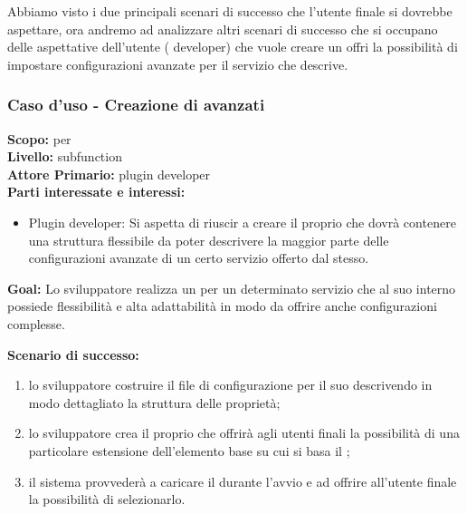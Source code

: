 \begin{flushleft}
\begin{boxedminipage}{\textwidth}
\end{boxedminipage}
\end{flushleft}
Abbiamo visto i due principali scenari di successo che l'utente finale si dovrebbe aspettare, ora andremo ad analizzare altri scenari di successo che si occupano delle aspettative dell'utente (\plugin{} developer) che vuole creare un \plugin{} offri la possibilità di impostare configurazioni avanzate per il servizio che descrive.

\begin{flushleft}
\begin{boxedminipage}{\textwidth}

\subsubsection*{Caso d'uso - Creazione di \plugin{} avanzati}

\textbf{Scopo:} \plugin{} per \visualnetkit{} \\
\textbf{Livello:} subfunction \\
\textbf{Attore Primario:} plugin developer \\
\textbf{Parti interessate e interessi:}
\begin{itemize}
\item Plugin developer: Si aspetta di riuscir a creare il proprio \plugin{} che dovrà contenere una struttura flessibile da poter descrivere la maggior parte delle configurazioni avanzate di un certo servizio offerto dal \plugin{} stesso.
\end{itemize}

\textbf{Goal:} Lo sviluppatore realizza un \plugin{} per un determinato servizio che al suo interno possiede flessibilità e alta adattabilità in modo da offrire anche configurazioni complesse.

\textbf{Scenario di successo:}
\begin{enumerate}
\item lo sviluppatore costruire il file di configurazione per il suo \plugin{} descrivendo in modo dettagliato la struttura delle proprietà;
\item lo sviluppatore crea il proprio \plugin{} che offrirà agli utenti finali la possibilità di una particolare estensione dell'elemento base su cui si basa il \plugin{};
\item il sistema provvederà a caricare il \plugin{} durante l'avvio e ad offrire all'utente finale la possibilità di selezionarlo.
\end{enumerate}

\end{boxedminipage}
\end{flushleft}

